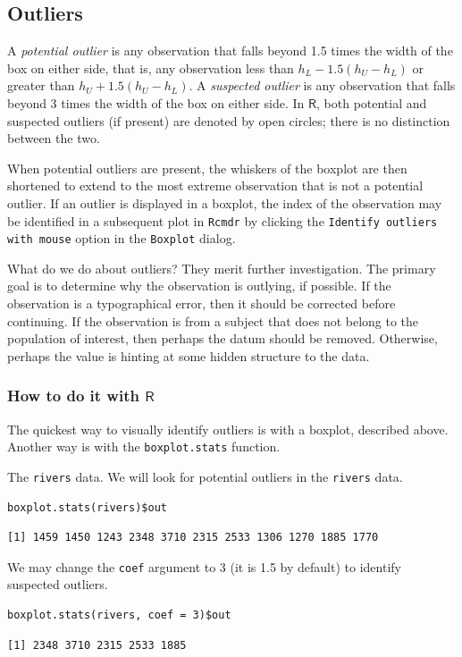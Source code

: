 \documentclass[10pt,english]{scrbook}
\begin{document}
\subsection[Outliers]{Outliers}
\label{sec-1-4-4}

A \emph{potential outlier} is any observation that falls beyond 1.5 times the width of the box on either side, that is, any observation less than \(h_{L}-1.5(h_{U}-h_{L})\) or greater than \(h_{U}+1.5(h_{U}-h_{L})\). A \emph{suspected outlier} is any observation that falls beyond 3 times the width of the box on either side. In \(\mathsf{R}\), both potential and suspected outliers (if present) are denoted by open circles; there is no distinction between the two. 

When potential outliers are present, the whiskers of the boxplot are then shortened to extend to the most extreme observation that is not a potential outlier. If an outlier is displayed in a boxplot, the index of the observation may be identified in a subsequent plot in \texttt{Rcmdr} by clicking the \texttt{Identify outliers with mouse} option in the \texttt{Boxplot} dialog.

What do we do about outliers? They merit further investigation. The primary goal is to determine why the observation is outlying, if possible. If the observation is a typographical error, then it should be corrected before continuing. If the observation is from a subject that does not belong to the population of interest, then perhaps the datum should be removed. Otherwise, perhaps the value is hinting at some hidden structure to the data.

\subsubsection[How to do it with \(\mathsf{R}\)]{How to do it with \(\mathsf{R}\)}
\label{sec-1-4-4-1}

The quickest way to visually identify outliers is with a boxplot, described above. Another way is with the \texttt{boxplot.stats} function.

\begin{exampletoo}

The \texttt{rivers} data. We will look for potential outliers in the \texttt{rivers} data.

\begin{verbatim}
boxplot.stats(rivers)$out
\end{verbatim}

\begin{verbatim}
[1] 1459 1450 1243 2348 3710 2315 2533 1306 1270 1885 1770
\end{verbatim}

We may change the \texttt{coef} argument to 3 (it is 1.5 by default) to identify suspected outliers.

\begin{verbatim}
boxplot.stats(rivers, coef = 3)$out
\end{verbatim}

\begin{verbatim}
[1] 2348 3710 2315 2533 1885
\end{verbatim}

\end{exampletoo}
\end{document}
